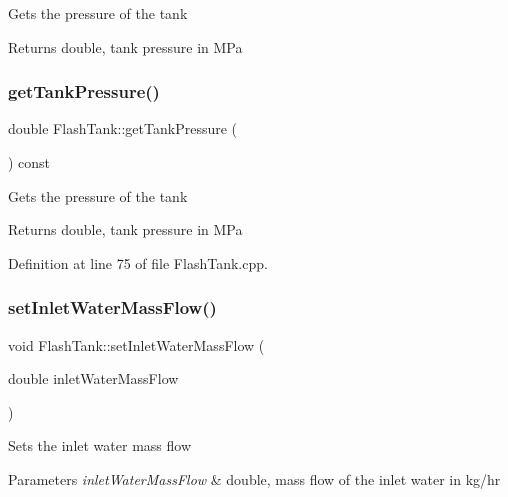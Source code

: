 Gets the pressure of the tank \begin{DoxyReturn}{Returns}
double, tank pressure in M\+Pa 
\end{DoxyReturn}
\mbox{\label{class_flash_tank_af5d4f0bf7babe61120e1e4452594e1af}} 
\subsubsection{\texorpdfstring{get\+Tank\+Pressure()}{getTankPressure()}\hspace{0.1cm}{\footnotesize\ttfamily [3/3]}}
{\footnotesize\ttfamily double Flash\+Tank\+::get\+Tank\+Pressure (\begin{DoxyParamCaption}{ }\end{DoxyParamCaption}) const}

Gets the pressure of the tank \begin{DoxyReturn}{Returns}
double, tank pressure in M\+Pa 
\end{DoxyReturn}


Definition at line 75 of file Flash\+Tank.\+cpp.

\mbox{\label{class_flash_tank_a2bcbd92d39ef3c760bdd65066ba3d34a}} 
\subsubsection{\texorpdfstring{set\+Inlet\+Water\+Mass\+Flow()}{setInletWaterMassFlow()}\hspace{0.1cm}{\footnotesize\ttfamily [1/3]}}
{\footnotesize\ttfamily void Flash\+Tank\+::set\+Inlet\+Water\+Mass\+Flow (\begin{DoxyParamCaption}\item[{double}]{inlet\+Water\+Mass\+Flow }\end{DoxyParamCaption})}

Sets the inlet water mass flow 
\begin{DoxyParams}{Parameters}
{\em inlet\+Water\+Mass\+Flow} & double, mass flow of the inlet water in kg/hr \\
\hline
\end{DoxyParams}
\mbox{\label{class_flash_tank_a2bcbd92d39ef3c760bdd65066ba3d34a}} 
